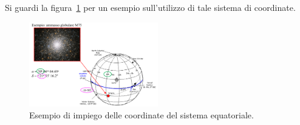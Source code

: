 Si guardi la figura~\ref{fig:esempio-sistema-equatoriale} per un esempio sull'utilizzo di tale sistema di coordinate.

\begin{figure}
\centering
\includegraphics[width=0.5\textwidth]{immagini/esempio-sistema-equatoriale.png}
\caption{Esempio di impiego delle coordinate del sistema equatoriale.}
\label{fig:esempio-sistema-equatoriale}
\end{figure}